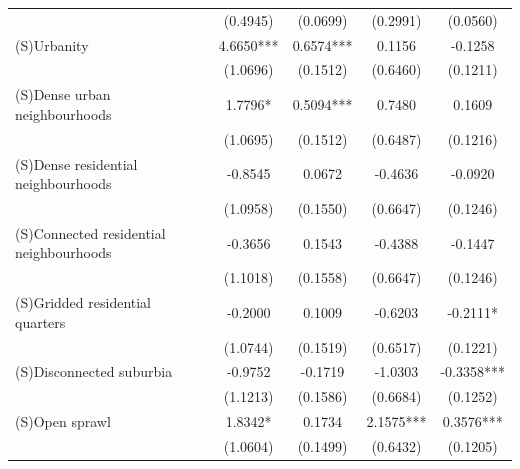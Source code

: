 \documentclass[]{interact}
\theoremstyle{plain}%
\theoremstyle{definition}
\theoremstyle{remark}
\begin{document}
\begin{table}
\begin{tabular}{lcccc}
                                                                  &    (0.4945) &        (0.0699) &     (0.2991) &          (0.0560) \\
                (S)Urbanity                                       &   4.6650*** &       0.6574*** &       0.1156 &           -0.1258 \\
                                                                  &    (1.0696) &        (0.1512) &     (0.6460) &          (0.1211) \\
                (S)Dense urban neighbourhoods                     &     1.7796* &       0.5094*** &       0.7480 &            0.1609 \\
                                                                  &    (1.0695) &        (0.1512) &     (0.6487) &          (0.1216) \\
                (S)Dense residential neighbourhoods               &     -0.8545 &          0.0672 &      -0.4636 &           -0.0920 \\
                                                                  &    (1.0958) &        (0.1550) &     (0.6647) &          (0.1246) \\
                (S)Connected residential neighbourhoods           &     -0.3656 &          0.1543 &      -0.4388 &           -0.1447 \\
                                                                  &    (1.1018) &        (0.1558) &     (0.6647) &          (0.1246) \\
                (S)Gridded residential quarters                   &     -0.2000 &          0.1009 &      -0.6203 &          -0.2111* \\
                                                                  &    (1.0744) &        (0.1519) &     (0.6517) &          (0.1221) \\
                (S)Disconnected suburbia                          &     -0.9752 &         -0.1719 &      -1.0303 &        -0.3358*** \\
                                                                  &    (1.1213) &        (0.1586) &     (0.6684) &          (0.1252) \\
                (S)Open sprawl                                    &     1.8342* &          0.1734 &    2.1575*** &         0.3576*** \\
                                                                  &    (1.0604) &        (0.1499) &     (0.6432) &          (0.1205) \\

\end{tabular}
\end{table}
\end{document}

